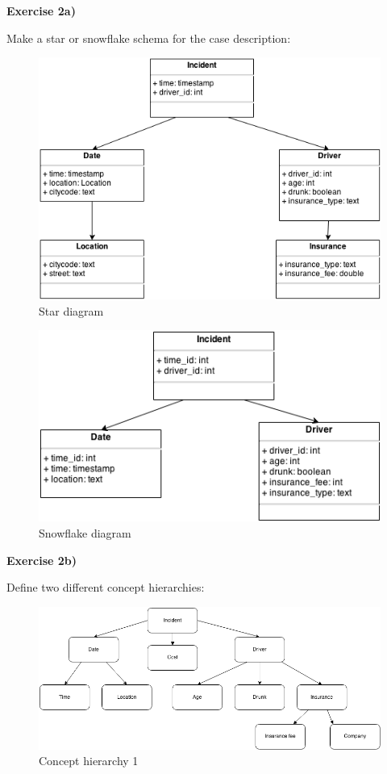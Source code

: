 {\bf \Huge Exercise 2a)}

\vspace{1cm}
Make a star or snowflake schema for the case description:

	\begin{figure}[H]
		\centering
		\includegraphics[scale=0.5]{pics/Snowflake.png}
		\caption{Star diagram}
	\end{figure}

	\begin{figure}[H]
		\centering
		\includegraphics[scale=0.5]{pics/StarDiagram.png}
		\caption{Snowflake diagram}
	\end{figure}

\clearpage
{\bf \Huge Exercise 2b)}

\vspace{1cm}
Define two different concept hierarchies:

	\begin{figure}[H]
		\centering
		\includegraphics[scale=0.5]{pics/Concept1.png}
		\caption{Concept hierarchy 1}
	\end{figure}

